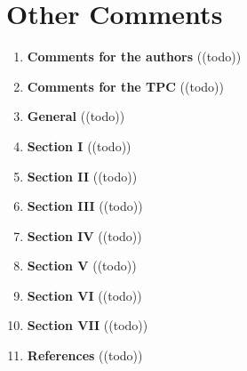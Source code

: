 \section{Other Comments}\label{sec:other}
\begin{enumerate}[resume]
    \item \textbf{Comments for the authors} 	\textcolor{HighlightColor}{((todo))}
    \item \textbf{Comments for the TPC} 	\textcolor{HighlightColor}{((todo))}
    \item \textbf{General} 	\textcolor{HighlightColor}{((todo))}
    \item \textbf{Section I} 	\textcolor{HighlightColor}{((todo))}
    \item \textbf{Section II} 	\textcolor{HighlightColor}{((todo))}
    \item \textbf{Section III} 	\textcolor{HighlightColor}{((todo))}
    \item \textbf{Section IV} 	\textcolor{HighlightColor}{((todo))}
    \item \textbf{Section V} 	\textcolor{HighlightColor}{((todo))}
    \item \textbf{Section VI} 	\textcolor{HighlightColor}{((todo))}
    \item \textbf{Section VII} 	\textcolor{HighlightColor}{((todo))}
    \item \textbf{References} 	\textcolor{HighlightColor}{((todo))}
\end{enumerate}
